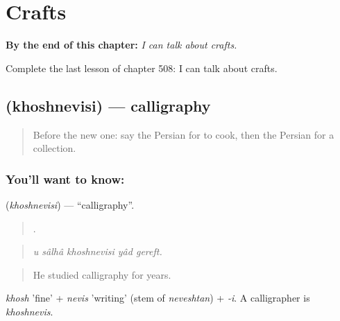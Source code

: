
\chapter{Crafts}
\label{ch:fa-crafts}

\begin{chapteropening}
\textbf{By the end of this chapter:} \emph{I can talk about crafts.}

Complete the last lesson of chapter 508: I can talk about crafts.
\end{chapteropening}

\section[\texorpdfstring{\fa{خوشنویسی} (khoshnevisi)}{خوشنویسی (khoshnevisi)}]{ (khoshnevisi) — calligraphy}

\label{lesson:FA-C508-khoshnevisi}



\begin{quote}
Before the new one: say the Persian for to cook, then the Persian for a collection.
\end{quote}

\subsection*{You'll want to know: }
\textbf{} (\emph{khoshnevisi}) — \textquotedblleft{}calligraphy\textquotedblright{}.

\begin{quote}
    .
\end{quote}

\begin{quote}
\emph{u sâlhâ khoshnevisi yâd gereft.}
\end{quote}

\begin{quote}
He studied calligraphy for years.
\end{quote}

\emph{khosh} 'fine' + \emph{nevis} 'writing' (stem of \emph{neveshtan}) + \emph{-i}. A calligrapher is \emph{khoshnevis}.

